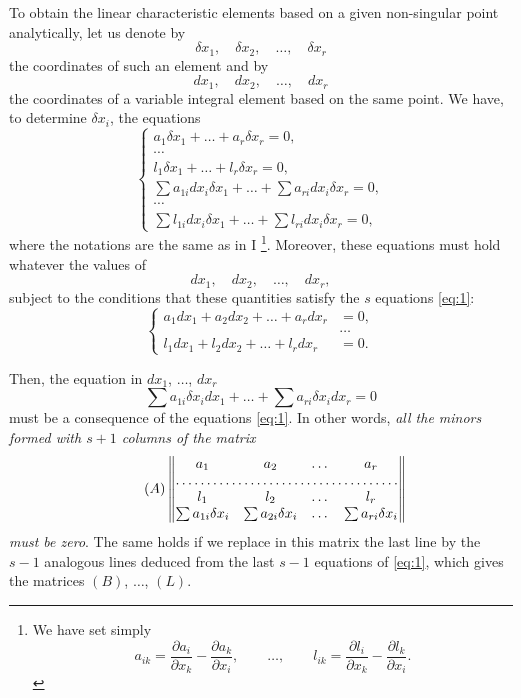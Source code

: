 \documentclass[leqno,11pt]{book}
\newcommand{\pd}{\partial}
\theoremstyle{shape1}
\theoremstyle{shapesmall}
\begin{document}
To obtain the linear characteristic elements based on a given non-singular point analytically, let us denote by
\[
\delta x_{1},\quad \delta x_{2},\quad \dots,\quad \delta x_{r}
\]
the coordinates of such an element and by
\[
dx_{1},\quad dx_{2},\quad \dots,\quad dx_{r}
\]
the coordinates of a variable integral element based on the same point. We have, to determine $\delta x_{i}$, the equations
\[
\left\{
  \begin{gathered}
    a_{1}\delta x_{1}+\dots+a_{r}\delta x_{r}=0,\\
    \cdots\\
    l_{1}\delta x_{1}+\dots+l_{r}\delta x_{r}=0,\\
    \sum a_{1i}dx_{i}\delta x_{1}+\dots+\sum a_{ri}dx_{i}\delta x_{r}=0,\\
    \cdots\\
    \sum l_{1i}dx_{i}\delta x_{1}+\dots+\sum l_{ri}dx_{i}\delta x_{r}=0,
  \end{gathered}
\right.
\]
where the notations are the same as in \textsection I \footnote{We have set simply
\[
a_{ik}=\frac{\pd a_{i}}{\pd x_{k}}-\frac{\pd a_{k}}{\pd x_{i}},\qquad\dots,\qquad
l_{ik}=\frac{\pd l_{i}}{\pd x_{k}}-\frac{\pd l_{k}}{\pd x_{i}}.
\]}. Moreover, these equations must hold whatever the values of
\[
dx_{1},\quad dx_{2},\quad \dots,\quad dx_{r},
\]
subject to the conditions that these quantities satisfy the $s$ equations \eqref{eq:1}:
\begin{equation}
  \tag{1}
  \left\{
    \begin{alignedat}{3}
       a_{1}dx_{1}+a_{2}dx_{2}+\dots+a_{r}dx_{r}&{}={}0,\\
      &\dots\\
      l_{1}dx_{1}+l_{2}dx_{2}+\dots+l_{r}dx_{r}&=0.
    \end{alignedat}
  \right.
\end{equation}

Then, the equation in $dx_{1}$, $\dots$, $dx_{r}$
\[
\sum a_{1i}\delta x_{i}dx_{1}+\dots+\sum a_{ri}\delta x_{i}dx_{r}=0
\]
must be a consequence of the equations \eqref{eq:1}. In other words, \emph{all the minors formed with $s+1$ columns of the matrix}
\begin{equation}
  \tag{$A$}
  \begin{Vmatrix}
    a_{1}&a_{2}&\dots&a_{r}\\
    \hdotsfor{4}\\
    l_{1}&l_{2}&\dots&l_{r}\\
    \sum a_{1i}\delta x_{i}&\sum a_{2i}\delta x_{i}&\dots&\sum a_{ri}\delta x_{i}
  \end{Vmatrix}
\end{equation}
\emph{must be zero}. The same holds if we replace in this matrix the last line by the $s-1$ analogous lines deduced from the last $s-1$ equations of \eqref{eq:1}, which gives the matrices $(B)$, $\dots$, $(L)$.
\end{document}
